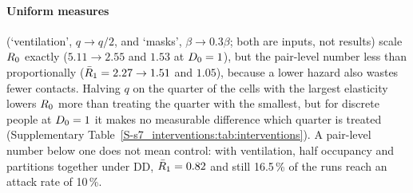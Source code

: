 \paragraph{Uniform measures} (`ventilation', $q\to q/2$, and `masks', $\beta\to0.3\beta$; both are inputs, not
results) scale $R_0$ exactly ($5.11\to2.55$ and $1.53$ at $D_0=1$), but the pair-level number less than
proportionally ($\bar{R}_1=2.27\to1.51$ and $1.05$), because a lower hazard also wastes fewer contacts. Halving
$q$ on the quarter of the cells with the largest elasticity lowers $R_0$ more than treating the quarter with the
smallest, but for discrete people at $D_0=1$ it makes no measurable difference which quarter is treated
(Supplementary Table~\ref{S-s7_interventions:tab:interventions}). A pair-level number below one does not mean
control: with ventilation, half occupancy and partitions together under DD, $\bar{R}_1=0.82$ and still
16.5\,\% of the runs reach an attack rate of 10\,\%.

